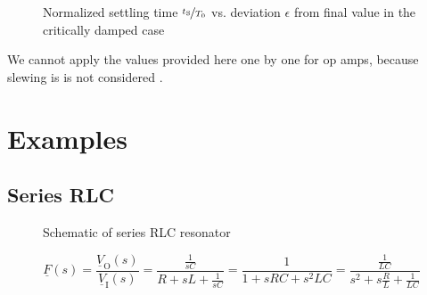 \documentclass{article}[11pt]
\begin{document}
\begin{figure}[H]
  \centering
  \caption{Normalized settling time $\nicefrac{t_{\mathrm{S}}}{T_{\mathrm{0}}}$
    vs. deviation $\epsilon$ from final value in the critically damped case}
  \label{fig:settling-crit-damped}
\end{figure}

We cannot apply the values provided here one by one for op amps, because slewing
is is not considered \cite{chuang-settlingop-82}.

\section{Examples}\label{sec:examples}

\subsection{Series RLC}

\begin{figure}[H]
  \centering
  \begin{circuitikz}
    
  \end{circuitikz}
  \caption{Schematic of series RLC resonator}
  \label{fig:series-res}
\end{figure}

\begin{equation}\label{eq:rlc-series:fs}
\underline{F}(s) = \frac{\underline{V}_{\mathrm{O}}(s)}{\underline{V}_{\mathrm{I}}(s)} 
                 = \frac{\frac{1}{sC}}{R+sL+\frac{1}{sC}}
                 = \frac{1}{1 + sRC+s^2LC}
                 = \frac{\frac{1}{LC}}{s^2+s \frac{R}{L} + \frac{1}{LC}}                 
\end{equation}
\end{document}
